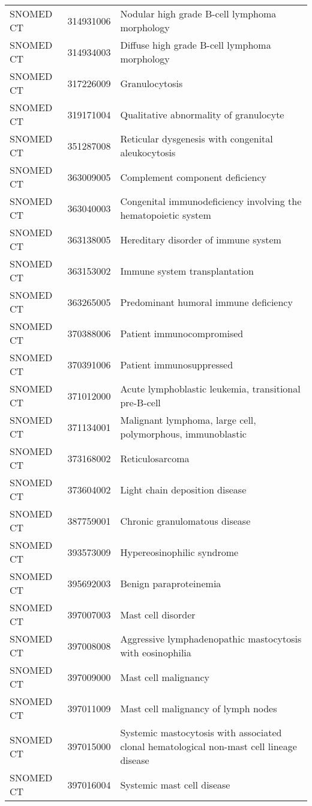 \begin{table}[ht]
\begin{tabular}{lll}
  SNOMED CT & 314931006 & Nodular high grade B-cell lymphoma morphology \\ 
  SNOMED CT & 314934003 & Diffuse high grade B-cell lymphoma morphology \\ 
  SNOMED CT & 317226009 & Granulocytosis \\ 
  SNOMED CT & 319171004 & Qualitative abnormality of granulocyte \\ 
  SNOMED CT & 351287008 & Reticular dysgenesis with congenital aleukocytosis \\ 
  SNOMED CT & 363009005 & Complement component deficiency \\ 
  SNOMED CT & 363040003 & Congenital immunodeficiency involving the hematopoietic system \\ 
  SNOMED CT & 363138005 & Hereditary disorder of immune system \\ 
  SNOMED CT & 363153002 & Immune system transplantation \\ 
  SNOMED CT & 363265005 & Predominant humoral immune deficiency \\ 
  SNOMED CT & 370388006 & Patient immunocompromised \\ 
  SNOMED CT & 370391006 & Patient immunosuppressed \\ 
  SNOMED CT & 371012000 & Acute lymphoblastic leukemia, transitional pre-B-cell \\ 
  SNOMED CT & 371134001 & Malignant lymphoma, large cell, polymorphous, immunoblastic \\ 
  SNOMED CT & 373168002 & Reticulosarcoma \\ 
  SNOMED CT & 373604002 & Light chain deposition disease \\ 
  SNOMED CT & 387759001 & Chronic granulomatous disease \\ 
  SNOMED CT & 393573009 & Hypereosinophilic syndrome \\ 
  SNOMED CT & 395692003 & Benign paraproteinemia \\ 
  SNOMED CT & 397007003 & Mast cell disorder \\ 
  SNOMED CT & 397008008 & Aggressive lymphadenopathic mastocytosis with eosinophilia \\ 
  SNOMED CT & 397009000 & Mast cell malignancy \\ 
  SNOMED CT & 397011009 & Mast cell malignancy of lymph nodes \\ 
  SNOMED CT & 397015000 & Systemic mastocytosis with associated clonal hematological non-mast cell lineage disease \\ 
  SNOMED CT & 397016004 & Systemic mast cell disease \\ 

\end{tabular}
\end{table}
